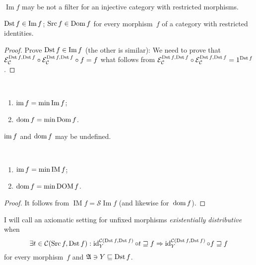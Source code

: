 \begin{conjecture}
$\operatorname{Im} f$ may be not a filter for an injective
category with restricted morphisms.
\end{conjecture}

\begin{prop}\label{dst-in-im}
$\operatorname{Dst} f\in\operatorname{Im} f$; $\operatorname{Src} f\in\operatorname{Dom} f$ for every morphism~$f$ of a category with restricted
identities.
\end{prop}

\begin{proof}
Prove $\operatorname{Dst} f\in\operatorname{Im} f$ (the other is similar):
We need to prove that $\mathcal{E}_{\mathcal{C}}^{\operatorname{Dst} f, \operatorname{Dst} f} \circ \mathcal{E}_{\mathcal{C}}^{\operatorname{Dst} f,
\operatorname{Dst} f} \circ f = f$ what follows from
$\mathcal{E}_{\mathcal{C}}^{\operatorname{Dst} f, \operatorname{Dst} f} \circ \mathcal{E}_{\mathcal{C}}^{\operatorname{Dst} f, \operatorname{Dst} f} = 1^{\operatorname{Dst} f}$.
\end{proof}

\begin{defn}
~
\begin{enumerate}
\item $\operatorname{im} f = \min\operatorname{Im} f$;
\item $\operatorname{dom} f = \min\operatorname{Dom} f$.
\end{enumerate}
\end{defn}

\begin{note}
$\operatorname{im} f$ and $\operatorname{dom} f$ may be undefined.
\end{note}

\begin{prop}
~
\begin{enumerate}
\item $\operatorname{im} f = \min\operatorname{IM} f$;
\item $\operatorname{dom} f = \min\operatorname{DOM} f$.
\end{enumerate}
\end{prop}

\begin{proof}
It follows from $\operatorname{IM}f=\mathscr{S}\operatorname{Im}f$
(and likewise for~$\operatorname{dom} f$).
\end{proof}

\begin{prop}
I will call an axiomatic setting for unfixed morphisms
\emph{existentially distributive} when
\[\exists t\in\mathcal{C}(\operatorname{Src} f,\operatorname{Dst} f) : \operatorname{id}^{\mathcal{C}(\operatorname{Dst} f,\operatorname{Dst} f)}_Y \circ t \sqsupseteq f \Rightarrow \operatorname{id}^{\mathcal{C}(\operatorname{Dst} f,\operatorname{Dst} f)}_Y \circ f
\sqsupseteq f\]
for every morphism~$f$ and $\mathfrak{A}\ni Y\sqsubseteq\operatorname{Dst} f$.
\end{prop}

